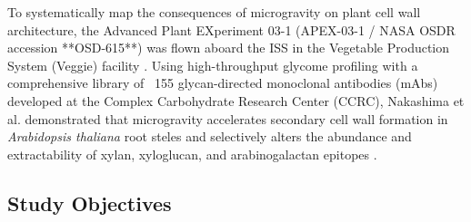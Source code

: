 To systematically map the consequences of microgravity on plant cell wall architecture, the Advanced Plant EXperiment 03-1 (APEX-03-1 / NASA OSDR accession **OSD-615**) was flown aboard the ISS in the Vegetable Production System (Veggie) facility \cite{Nakashima2023}. Using high-throughput glycome profiling with a comprehensive library of ~155 glycan-directed monoclonal antibodies (mAbs) developed at the Complex Carbohydrate Research Center (CCRC), Nakashima et al. demonstrated that microgravity accelerates secondary cell wall formation in \textit{Arabidopsis thaliana} root steles and selectively alters the abundance and extractability of xylan, xyloglucan, and arabinogalactan epitopes \cite{Nakashima2023, Pattathil2010}.

\subsection{Study Objectives}


